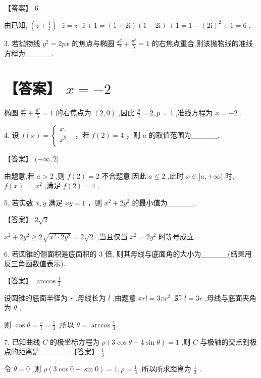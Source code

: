 \documentclass[10pt]{article}
\begin{document}
【答案】 6

由已知, \(\left( {z + \frac{1}{\bar{z}}}\right)  \cdot  \bar{z} = z \cdot  \bar{z} + 1 = \left( {1 + 2\mathrm{i}}\right) \left( {1 - 2\mathrm{i}}\right)  + 1 = 1 - {\left( 2\mathrm{i}\right) }^{2} + 1 = 6\) .

3. 若抛物线 \({y}^{2} = {2px}\) 的焦点与椭圆 \(\frac{{x}^{2}}{9} + \frac{{y}^{2}}{5} = 1\) 的右焦点重合,则该抛物线的准线方程为\_\_\_\_\_.

\section*{【答案】 \(x =  - 2\)}

椭圆 \(\frac{{x}^{2}}{9} + \frac{{y}^{2}}{5} = 1\) 的右焦点为 \(\left( {2,0}\right)\) ,因此 \(\frac{p}{2} = 2,p = 4\) ,准线方程为 \(x =  - 2\) .

4. 设 \(f\left( x\right)  = \left\{  \begin{array}{l} x, \\  {x}^{2}, \end{array}\right.\) ，若 \(f\left( 2\right)  = 4\) ，则 \(a\) 的取值范围为\_\_\_\_\_.

【答案】 \(( - \infty ,2\rbrack\)

由题意,若 \(a > 2\) ,则 \(f\left( 2\right)  = 2\) 不合题意,因此 \(a \leq  2\) ,此时 \(x \in  \lbrack a, + \infty )\) 时, \(f\left( x\right) \; = {x}^{2}\) ,满足 \(f\left( 2\right)  = 4\) .

5. 若实数 \(x,y\) 满足 \({xy} = 1\) ，则 \({x}^{2} + 2{y}^{2}\) 的最小值为\_\_\_\_\_.

【答案】 \(2\sqrt{2}\)

\({x}^{2} + 2{y}^{2} \geq  2\sqrt{{x}^{2} \cdot  2{y}^{2}} = 2\sqrt{2}\) ,当且仅当 \({x}^{2} = 2{y}^{2}\) 时等号成立.

6. 若圆锥的侧面积是底面积的 3 倍, 则其母线与底面角的大小为\_\_\_\_\_(结果用反三角函数值表示).

【答案】 \(\arccos \frac{1}{3}\)

设圆锥的底面半径为 \(r\) ,母线长为 \(l\) ,由题意 \({\pi rl} = {3\pi }{r}^{2}\) ,即 \(l = {3r}\) ,母线与底面夹角为 \(\theta\) ,

则 \(\cos \theta  = \frac{r}{l} = \frac{1}{3}\) ,所以 \(\theta  = \arccos \frac{1}{3}\) .

7. 已知曲线 \(C\) 的极坐标方程为 \(\rho \left( {3\cos \theta  - 4\sin \theta }\right)  = 1\) ,则 \(C\) 与极轴的交点到极点的距离是\_\_\_\_\_. 【答案】 \(\frac{1}{3}\)

令 \(\theta  = 0\) ,则 \(\rho \left( {3\cos 0 - \sin 0}\right)  = 1,\rho  = \frac{1}{3}\) ,所以所求距离为 \(\frac{1}{3}\) .
\end{document}
